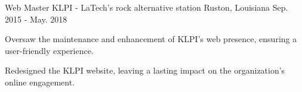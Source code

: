 \begin{cventries}
  \cventry
    {Web Master} %
    {KLPI - LaTech's rock alternative station} %
    {Ruston, Louisiana} %
    {Sep. 2015 - May. 2018} %
    {
      \begin{cvitems} %
        \item{Oversaw the maintenance and enhancement of KLPI’s web presence, ensuring a user-friendly experience.}
        \item{Redesigned the KLPI website, leaving a lasting impact on the organization's online engagement.}
      \end{cvitems}
    }

\end{cventries}
